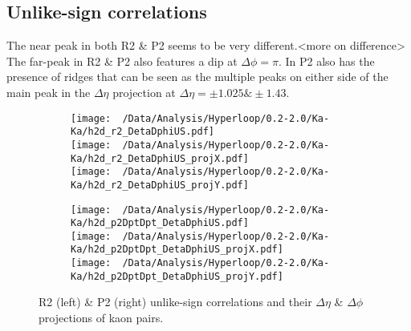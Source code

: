 \documentclass[12pt,a4paper,twoside]{report}
\begin{document}
\subsection{Unlike-sign correlations}
The near peak in both R2 \& P2 seems to be very different.<more on difference> The far-peak in R2 \& P2 also features a dip at $\Delta\phi=\pi$. In P2 also has the presence of ridges that can be seen as the multiple peaks on either side of the main peak in the $\Delta\eta$ projection at $\Delta\eta=\pm1.025\&\pm1.43$.
\begin{figure}[H]
	\begin{subfigure}{0.49\linewidth}
		\texttt{[image: ~/Data/Analysis/Hyperloop/0.2-2.0/Ka-Ka/h2d\_r2\_DetaDphiUS.pdf]}\\
		\texttt{[image: ~/Data/Analysis/Hyperloop/0.2-2.0/Ka-Ka/h2d\_r2\_DetaDphiUS\_projX.pdf]}\\
		\texttt{[image: ~/Data/Analysis/Hyperloop/0.2-2.0/Ka-Ka/h2d\_r2\_DetaDphiUS\_projY.pdf]}\\
	\end{subfigure}
	\begin{subfigure}{0.49\linewidth}
		\texttt{[image: ~/Data/Analysis/Hyperloop/0.2-2.0/Ka-Ka/h2d\_p2DptDpt\_DetaDphiUS.pdf]}\\
		\texttt{[image: ~/Data/Analysis/Hyperloop/0.2-2.0/Ka-Ka/h2d\_p2DptDpt\_DetaDphiUS\_projX.pdf]}\\
		\texttt{[image: ~/Data/Analysis/Hyperloop/0.2-2.0/Ka-Ka/h2d\_p2DptDpt\_DetaDphiUS\_projY.pdf]}\\
	\end{subfigure}
	\caption{R2 (left) \& P2 (right) unlike-sign correlations and their $\Delta\eta$ \& $\Delta\phi$ projections of kaon pairs.}
\end{figure}
\end{document}
